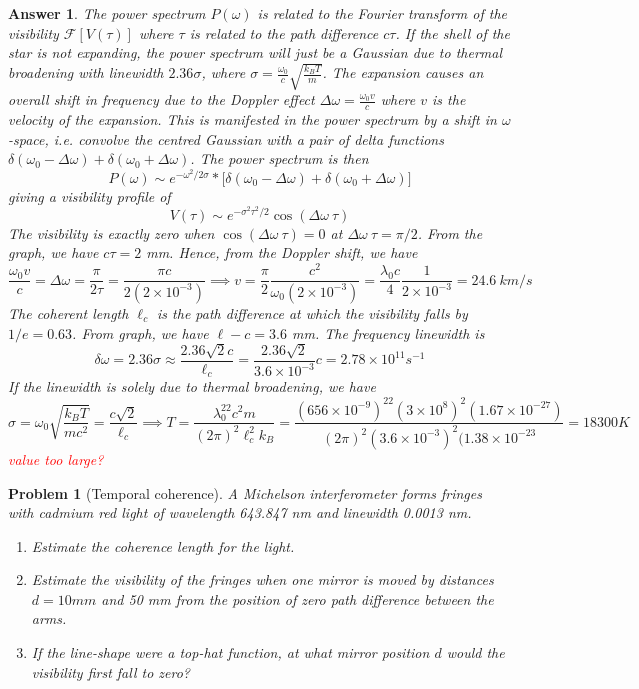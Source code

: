 \documentclass[a4paper]{article}
\newtheorem{ans}{Answer}
\theoremstyle{new}
\newtheorem{qns}{Problem}
\begin{document}
\begin{ans}
The power spectrum $P(\omega)$ is related to the Fourier transform of the visibility $\mathcal{F}[V(\tau)]$ where $\tau$ is related to the path difference $c\tau$. If the shell of the star is not expanding, the power spectrum will just be a Gaussian due to thermal broadening with linewidth $2.36\sigma$, where $\sigma=\frac{\omega_0}{c}\sqrt{\frac{k_BT}{m}}$. The expansion causes an overall shift in frequency due to the Doppler effect $\Delta\omega=\frac{\omega_0v}{c}$ where $v$ is the velocity of the expansion. This is manifested in the power spectrum by a shift in $\omega$-space, i.e. convolve the centred Gaussian with a pair of delta functions $\delta(\omega_0-\Delta\omega)+\delta(\omega_0+\Delta\omega)$. The power spectrum is then
$$P(\omega)\sim e^{-\omega^2/2\sigma}*\bigg[\delta(\omega_0-\Delta\omega)+\delta(\omega_0+\Delta\omega)\bigg]$$
giving a visibility profile of
$$V(\tau)\sim e^{-\sigma^2\tau^2/2}\cos(\Delta\omega~\tau)$$
The visibility is exactly zero when $\cos(\Delta\omega~\tau)=0$ at $\Delta\omega~\tau=\pi/2$. From the graph, we have $c\tau=2$ mm. Hence, from the Doppler shift, we have
$$\frac{\omega_0v}{c}=\Delta\omega=\frac{\pi}{2\tau}=\frac{\pi c}{2(2\times10^{-3})}\implies v=\frac{\pi}{2}\frac{c^2}{\omega_0(2\times10^{-3})}=\frac{\lambda_0c}{4}\frac{1}{2\times10^{-3}}=24.6~km/s$$
The coherent length $\ell_c$ is the path difference at which the visibility falls by $1/e=0.63$. From graph, we have $\ell-c=3.6$ mm. The frequency linewidth is 
$$\delta\omega=2.36\sigma\approx\frac{2.36\sqrt{2}c}{\ell_c}=\frac{2.36\sqrt{2}}{3.6\times10^{-3}}c=2.78\times10^{11}s^{-1}$$
If the linewidth is solely due to thermal broadening, we have
$$\sigma=\omega_0\sqrt{\frac{k_BT}{mc^2}}=\frac{c\sqrt{2}}{\ell_c}\implies T=\frac{\lambda_0^22c^2m}{(2\pi)^2\ell_c^2k_B}=\frac{(656\times10^{-9})^22(3\times10^8)^2(1.67\times10^{-27})}{(2\pi)^2(3.6\times10^{-3})^2(1.38\times10^{-23}}=18300 K$$
\textcolor{red}{value too large?}
\end{ans}
\newpage
\begin{qns}[Temporal coherence]
A Michelson interferometer forms fringes with cadmium red light of wavelength 643.847 nm and linewidth 0.0013 nm.
\begin{enumerate}[label=(\alph*)]
\item Estimate the coherence length for the light.
\item  Estimate the visibility of the fringes when one mirror is moved by distances $d= 10 mm$ and 50 mm from the position of zero path difference between the arms.
\item If the line-shape were a top-hat function, at what mirror position $d$ would the visibility first fall to zero?
\end{enumerate}
\end{qns}
\end{document}
